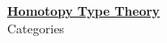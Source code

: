 \documentclass[hott-all.tex]{subfiles}
\begin{document}
\begin{center}
  {\Large{\underline{\textbf{Homotopy Type Theory}}}} \\[2mm]
  {\large Categories}
\end{center}


\setcounter{chapter}{9}



%
%
\end{document}
